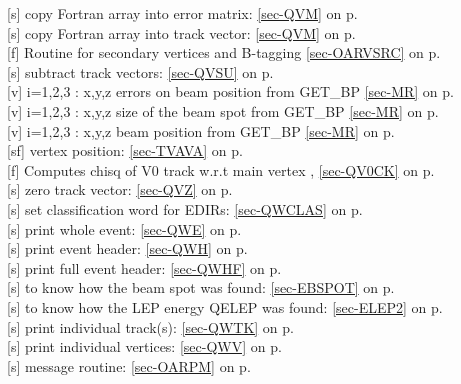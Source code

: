 [s] copy Fortran array into error matrix:
 \ref{sec-QVM} on p.~\pageref{sec-QVM}\\
 [s] copy Fortran array into track vector:
 \ref{sec-QVM} on p.~\pageref{sec-QVM}\\
 [f] Routine for secondary vertices and B-tagging
 \ref{sec-OARVSRC} on p.~\pageref{sec-OARVSRC}\\
 [s] subtract track vectors: \ref{sec-QVSU} on p.~\pageref{sec-QVSU}\\
 [v] i=1,2,3 : x,y,z errors on beam position from GET\_BP
 \ref{sec-MR} on p.~\pageref{sec-MR}\\
 [v] i=1,2,3 : x,y,z size of the beam spot from GET\_BP
 \ref{sec-MR} on p.~\pageref{sec-MR}\\
 [v] i=1,2,3 : x,y,z beam position from GET\_BP
 \ref{sec-MR} on p.~\pageref{sec-MR}\\
 [sf] vertex position: \ref{sec-TVAVA} on p.~\pageref{sec-TVAVA}\\
 [f] Computes chisq of V0 track w.r.t main vertex ,
 \ref{sec-QV0CK} on p.~\pageref{sec-QV0CK}\\
 [s] zero track vector: \ref{sec-QVZ} on p.~\pageref{sec-QVZ} \\
 [s] set classification word for EDIRs: \ref{sec-QWCLAS} on p.~\pageref{sec-QWCLAS}\\
 [s] print whole event: \ref{sec-QWE} on p.~\pageref{sec-QWE}\\
 [s] print event header: \ref{sec-QWH} on p.~\pageref{sec-QWH}\\
 [s] print full event
 header: \ref{sec-QWHF} on p.~\pageref{sec-QWHF}\\
 [s] to know how the beam spot was found:
  \ref{sec-EBSPOT} on p.~\pageref{sec-EBSPOT}\\
 [s] to know how the LEP energy QELEP was found:
  \ref{sec-ELEP2} on p.~\pageref{sec-ELEP2}\\
 [s] print individual track(s): \ref{sec-QWTK} on p.~\pageref{sec-QWTK}\\
 [s] print individual vertices: \ref{sec-QWV} on p.~\pageref{sec-QWV}\\
 [s] message routine: \ref{sec-OARPM} on p.~\pageref{sec-OARPM}\\
